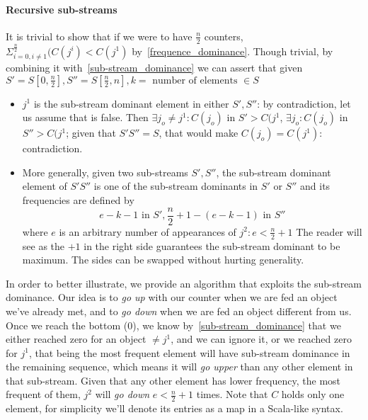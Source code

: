 \paragraph{Recursive sub-streams} It is trivial to show that if we were to have
$\frac{n}{2}$ counters, $\Sigma^{\frac{n}{2}}_{i = 0, i \neq 1}(C(j^{i}) < C(j^{1})$
by~\ref{frequence_dominance}.
Though trivial, by combining it with~\ref{sub-stream_dominance} we can assert that
given $S' = S[0, \frac{n}{2}], S'' = S[\frac{n}{2}, n], k = \textrm{ number of elements } \in S$
    \begin{itemize}
    \item \textbf{$j^{1}$} is the sub-stream dominant element in either $S', S''$:
    by contradiction, let us assume that is false. Then
    $\exists j_{o} \neq j^{1}: C(j_{o})$ in $S' > C(j^{1}$, $\exists j_{o}: C(j_{o})$ in $S'' > C(j^{1}$;
    given that $S'S'' = S$, that would make $C(j_{o}) = C(j^{1})$: contradiction.
    \item More generally, given two sub-streams $S', S''$, the sub-stream
    dominant element of $S'S''$ is one of the sub-stream dominants in
    $S'$ or $S''$ and its frequencies are defined by
        \begin{equation}
        e - k - 1\textrm{ in } S', \frac{n}{2} + 1 - (e - k - 1) \textrm{ in } S''
        \end{equation}
    where $e$ is an arbitrary number of appearances of $j^{2}: e < \frac{n}{2} + 1$
    The reader will see as the $+1$ in the right side guarantees the
    sub-stream dominant to be maximum.
    The sides can be swapped without hurting generality.
    \end{itemize}

In order to better illustrate, we provide an algorithm that exploits the
sub-stream dominance.
Our idea is to \emph{go up} with our counter when we are fed an object we've
already met, and to \emph{go down} when we are fed an object different from
us.
Once we reach the bottom (0), we know by~\ref{sub-stream_dominance} that
we either reached zero for an object $\neq j^{1}$, and we can ignore it,
or we reached zero for $j^{1}$, that being the most frequent element will
have sub-stream dominance in the remaining sequence, which means it will
\emph{go upper} than any other element in that sub-stream.
Given that any other element has lower frequency, the most frequent of
them, $j^{2}$ will \emph{go down} $e < \frac{n}{2} + 1$ times.
Note that $C$ holds only one element, for simplicity we'll denote its entries as
a map in a Scala-like syntax.

